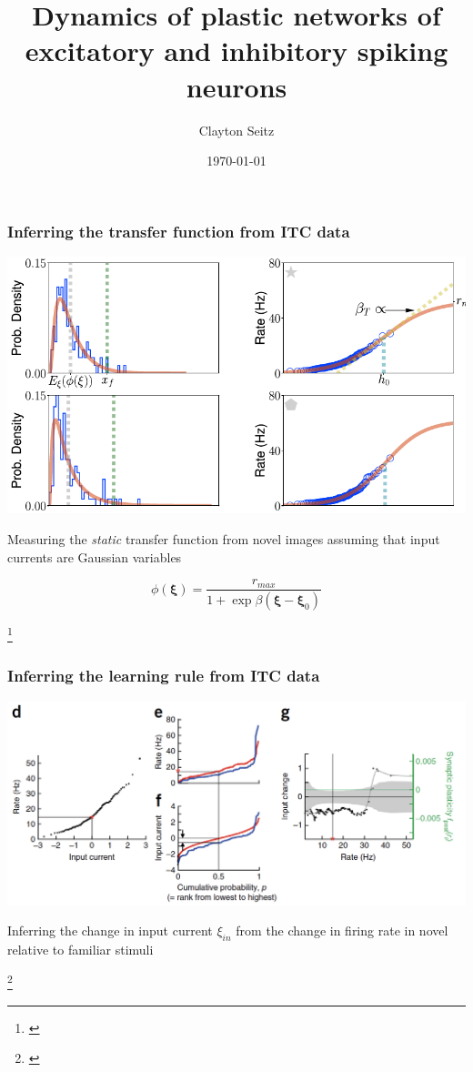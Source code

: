 \documentclass{beamer}
\begin{document}
\title{Dynamics of plastic networks of excitatory and inhibitory spiking neurons}  
\author{Clayton Seitz}
\date{\today} 

\begin{frame}[plain]
\titlepage
\end{frame}


\begin{frame}[plain]
\frametitle{Inferring the transfer function from ITC data}

\vspace{0.2in}

\begin{center}
\includegraphics[scale=0.5]{transfer-function}
\end{center}

Measuring the \emph{static} transfer function from novel images assuming that input currents are Gaussian variables

\begin{equation*}
\phi(\bm{\xi}) = \frac{r_{max}}{1 + \exp \beta (\bm{\xi}- \bm{\xi}_{0})}
\end{equation*}


\footnote{\cite{peirera}}
\end{frame}

\begin{frame}[plain]
\frametitle{Inferring the learning rule from ITC data}

\begin{center}
\includegraphics[scale=0.55]{learning-rules}
\end{center}

Inferring the change in input current $\xi_{in}$ from the change in firing rate in {\color{red} novel} relative to {\color{blue} familiar} stimuli

\footnote{\cite{lim}}

\end{frame}
\end{document}
